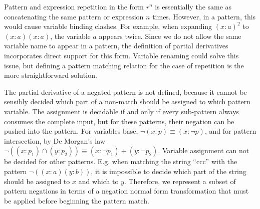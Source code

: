 Pattern and expression repetition in the form $r^n$ is essentially the same as
concatenating the same pattern or expression $n$ times. However, in a pattern,
this would cause variable binding clashes. For example, when expanding
$(x:a)^2$ to $(x:a)(x:a)$, the variable $a$ appears twice. Since we do not
allow the same variable name to appear in a pattern, the definition of partial
derivatives incorporates direct support for this form. Variable renaming could
solve this issue, but defining a pattern matching relation for the case of
repetition is the more straightforward solution.

The partial derivative of a negated pattern is not defined, because it cannot
be sensibly decided which part of a non-match should be assigned to which
pattern variable. The assignment is decidable if and only if every sub-pattern
always consumes the complete input, but for these patterns, their negation can
be pushed into the pattern. For variables base, $\neg(x:p) \equiv (x:\neg p)$,
and for pattern intersection, by De Morgan's law $\neg((x:p_1) \cap (y:p_2))
\equiv (x:\neg p_1) + (y:\neg p_2)$. Variable assignment can not be decided
for other patterns. E.g. when matching the string ``ccc'' with the pattern
$\neg((x:a)(y:b))$, it is impossible to decide which part of the string should
be assigned to $x$ and which to $y$. Therefore, we represent a subset of
pattern negations in terms of a negation normal form transformation that must
be applied before beginning the pattern match.

\needspace{6cm}

